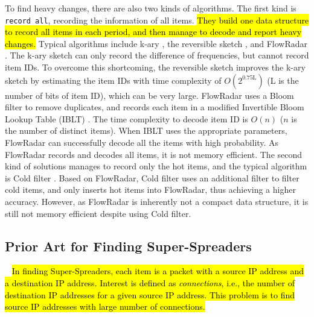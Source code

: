 To find heavy changes, there are also two kinds of algorithms.
%
The first kind is \texttt{record all}, recording the information of all items.
\hl{They build one data structure to record all items in each period, and then manage to decode and report heavy changes.} Typical algorithms include k-ary \cite{kary}, the reversible sketch \cite{revsketch}, and FlowRadar \cite{flowradar}. 
%
The k-ary sketch \cite{kary} can only record the difference of frequencies, but cannot record item IDs.
%
To overcome this shortcoming, the reversible sketch \cite{revsketch} improves the k-ary sketch by estimating the item IDs with time complexity of $O(2^{0.75\text{L}})$ (L is the number of bits of item ID), which can be very large. 
FlowRadar \cite{flowradar} uses a Bloom filter to remove duplicates, and records each item in a modified Invertible Bloom Lookup Table (IBLT) \cite{iblt}. The time complexity to decode item ID is $O(n)$ ($n$ is the number of distinct items). When IBLT uses the appropriate parameters, FlowRadar can successfully decode all the items with high probability. As FlowRadar records and decodes all items, it is not memory efficient. 
%
The second kind of solutions manages to record only the hot items, and the typical algorithm is Cold filter \cite{coldfilter}. Based on FlowRadar, Cold filter \cite{coldfilter} uses an additional filter to filter cold items, and only inserts hot items into FlowRadar, thus achieving a higher accuracy.
%
However, as FlowRadar is inherently not a compact data structure, it is still not memory efficient despite using Cold filter.


			


\vvv
\presec
\subsection{Prior Art for Finding Super-Spreaders}\postsec~
%
\hl{
In finding Super-Spreaders, each item is a packet with a source IP address and a destination IP address. Interest is defined as \textit{connections}, i.e., the number of destination IP addresses for a given source IP address. This problem is to find source IP addresses with large number of connections.}

